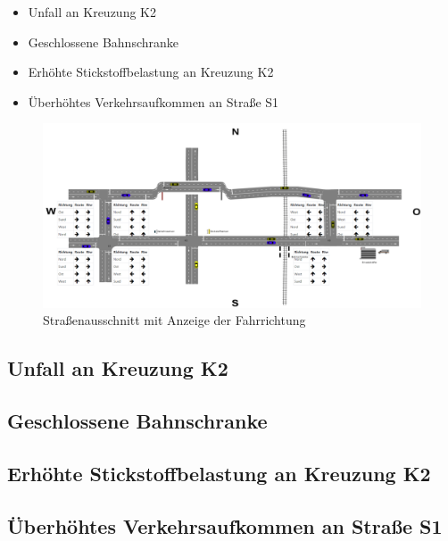 \begin{itemize} 
\item Unfall an Kreuzung K2
\item Geschlossene Bahnschranke
\item Erhöhte Stickstoffbelastung an Kreuzung K2
\item Überhöhtes Verkehrsaufkommen an Straße S1
\end{itemize}

\begin{figure}[ht]
	\includegraphics[width=\textwidth]{images/dataanalyticswebapp.png}
	\caption{Straßenausschnitt mit Anzeige der Fahrrichtung}
	\label{fig2}
\end{figure}

\subsection{Unfall an Kreuzung K2}
\subsection{Geschlossene Bahnschranke}
\subsection{Erhöhte Stickstoffbelastung an Kreuzung K2}
\subsection{Überhöhtes Verkehrsaufkommen an Straße S1}

\clearpage
